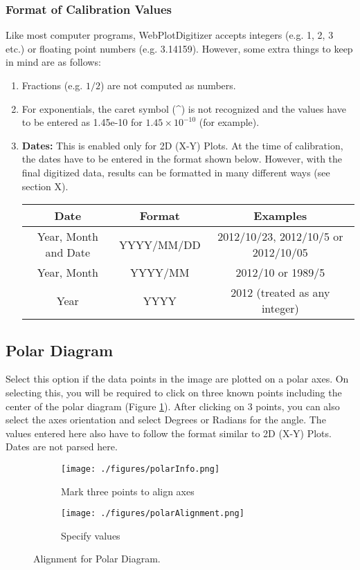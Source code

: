 \documentclass[letterpaper, 10pt]{article}
\begin{document}
\subsubsection{Format of Calibration Values}
Like most computer programs, WebPlotDigitizer accepts integers (e.g. 1, 2, 3 etc.) or floating point numbers (e.g. 3.14159). However, some extra things to keep in mind are as follows:
\begin{enumerate}
\item{Fractions (e.g. $1/2$) are not computed as numbers.}
\item{For exponentials, the caret symbol (\^{}) is not recognized and the values have to be entered as 1.45e-10 for $1.45 \times 10^{-10}$ (for example).}
\item{{\bf Dates:} This is enabled only for 2D (X-Y) Plots. At the time of calibration, the dates have to be entered in the format shown below. However, with the final digitized data, results can be formatted in many different ways (see section X).
\begin{center}
\begin{tabular}{|c|c|c|}
\hline
Date & Format & Examples\\
\hline
Year, Month and Date & YYYY/MM/DD & 2012/10/23, 2012/10/5 or 2012/10/05\\
Year, Month & YYYY/MM & 2012/10 or 1989/5\\
Year & YYYY & 2012 (treated as any integer)\\
\hline
\end{tabular}
\end{center}
}
\end{enumerate}





\subsection{Polar Diagram}
Select this option if the data points in the image are plotted on a polar axes. On selecting this, you will be required to click on three known points including the center of the polar diagram (Figure \ref{fig:polarAlignment}). After clicking on 3 points, you can also select the axes orientation and select Degrees or Radians for the angle. The values entered here also have to follow the format similar to 2D (X-Y) Plots. Dates are not parsed here.

\begin{figure}
\centering
{\begin{subfigure}[b]{0.4\textwidth}
\texttt{[image: ./figures/polarInfo.png]}
\caption{Mark three points to align axes}
\end{subfigure}
\begin{subfigure}[b]{0.3\textwidth}
\texttt{[image: ./figures/polarAlignment.png]}
\caption{Specify values}
\end{subfigure}}
\caption{Alignment for Polar Diagram.}
\label{fig:polarAlignment}
\end{figure}
 
\end{document}
